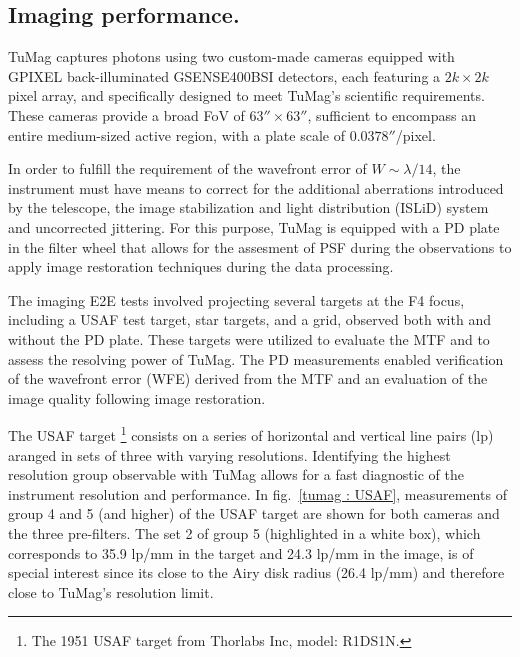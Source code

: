 \subsection{Imaging performance.}
TuMag captures photons using two custom-made cameras \citep{tumag-cams} equipped with GPIXEL back-illuminated GSENSE400BSI detectors, each featuring a $2k \times 2k$ pixel array, and specifically designed to meet TuMag's scientific requirements. These cameras provide a broad FoV of $63'' \times 63''$, sufficient to encompass an entire medium-sized active region, with a plate scale of $0.0378''$/pixel.

In order to fulfill the requirement of the wavefront error of $W \sim \lambda / 14$, the instrument must have means to correct for the additional aberrations introduced by the telescope, the image stabilization and light distribution (ISLiD) system and uncorrected jittering. For this purpose, TuMag is equipped with a PD plate in the filter wheel that allows for the assesment of PSF during the observations to apply image restoration techniques during the data processing.  

The imaging E2E tests involved projecting several targets at the F4 focus, including a USAF test target, star targets, and a grid, observed both with and without the PD plate. These targets were utilized to evaluate the MTF and to assess the resolving power of TuMag. The PD measurements enabled verification of the wavefront error (WFE) derived from the MTF and an evaluation of the image quality following image restoration. 

The USAF target \footnote{The 1951 USAF target from Thorlabs Inc, model: R1DS1N.} consists on a series of horizontal and vertical line pairs (lp) aranged in sets of three with varying resolutions. Identifying the highest resolution group observable with TuMag allows for a fast diagnostic of the instrument resolution and performance. In fig.~\ref{tumag : USAF}, measurements of group 4 and 5 (and higher) of the USAF target are shown for both cameras and the three pre-filters. The set 2 of group 5 (highlighted in a white box), which corresponds to 35.9 lp/mm in the target and 24.3 lp/mm in the image, is of special interest since its close to the Airy disk radius (26.4 lp/mm) and therefore close to TuMag's resolution limit. 

